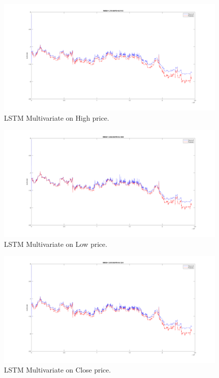 \documentclass[11pt]{article}
\begin{document}
\begin{figure}[H]
  \centering
  \includegraphics[width=\linewidth,keepaspectratio]{figs/lstm_multi_high.png}
  \caption{LSTM Multivariate on High price.}
\end{figure}

\begin{figure}[H]
  \centering
  \includegraphics[width=\linewidth,keepaspectratio]{figs/lstm_multi_low.png}
  \caption{LSTM Multivariate on Low price.}
\end{figure}

\begin{figure}[H]
  \centering
  \includegraphics[width=\linewidth,keepaspectratio]{figs/lstm_multi_close.png}
  \caption{LSTM Multivariate on Close price.}
\end{figure}
\end{document}
